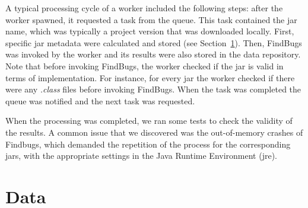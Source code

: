 \documentclass{sig-alternate}
\begin{document}
A typical processing cycle of a worker included the
following steps: after the worker spawned, it requested a task
from the queue. This task contained the {\sc jar} name, which
was typically a project version that was downloaded locally.
First, specific {\sc jar} metadata were calculated and stored
(see Section~\ref{sec:data}).
Then, FindBugs was invoked
by the worker and its results were also stored in the data
repository.
Note that before invoking FindBugs,
the worker checked if the {\sc jar} is valid in terms of implementation.
For instance, for every {\sc jar} the worker checked
if there were any {\it .class} files before invoking FindBugs.
When the task was completed
the queue was notified and the next task was requested.

When the processing was completed, we ran some tests
to check the validity of the results.
A common issue that we discovered was the out-of-memory
crashes of Findbugs, which demanded the repetition of the process
for the corresponding {\sc jar}s, with the appropriate
settings in the Java Runtime Environment ({\sc jre}).

\section{Data}
\label{sec:data}

\begin{table}[t]
\centering
{}
\caption{Bug categorization according to FindBugs.}
\label{tbl:bug-cat}
\end{table}
\end{document}
